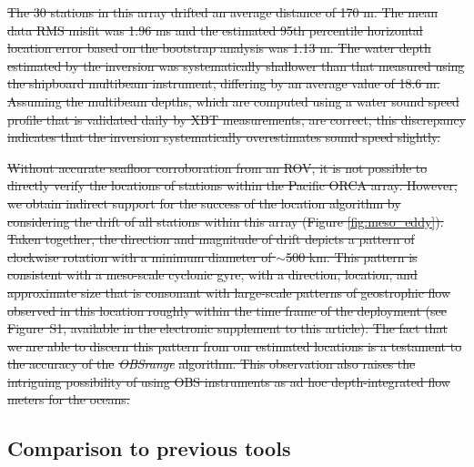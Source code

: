 \documentclass[10pt,titlepage]{article}
\providecommand{\DIFdeltex}[1]{{\protect\color{red}\sout{#1}}}                      %
\providecommand{\DIFaddbegin}{} %
\providecommand{\DIFaddend}{} %
\providecommand{\DIFdelbegin}{} %
\providecommand{\DIFdelend}{} %
\providecommand{\DIFdel}[1]{\texorpdfstring{\DIFdeltex{#1}}{}} %
\begin{document}
\DIFdelbegin \DIFdel{The 30 stations in this array drifted an average distance of 170 m. The mean data RMS misfit was 1.96 ms and the estimated 95th percentile horizontal location error based on the bootstrap analysis was 1.13 m. The water depth estimated by the inversion was systematically shallower than that measured using the shipboard multibeam instrument, differing by an average value of 18.6 m. Assuming the multibeam depths, which are computed using a water sound speed profile that is validated daily by XBT measurements, are correct, this discrepancy indicates that the inversion systematically overestimates sound speed slightly. 
}%

\DIFdel{Without accurate seafloor corroboration from an ROV, it is not possible to directly verify the locations of stations within the Pacific ORCA array. However, we  obtain indirect support for the success of the location algorithm by considering the drift of all stations within this array (Figure \ref{fig:meso_eddy}).
Taken together, the direction and magnitude of drift depicts a pattern of clockwise rotation with a minimum diameter of $\sim$500 km. This pattern is consistent with a meso-scale cyclonic gyre, with a direction, location, and approximate size that is consonant with large-scale patterns of geostrophic flow observed in this location roughly within the time frame of the deployment (see Figure~S1, available in the electronic supplement to this article). The fact that we are able to discern this pattern from our estimated locations is a testament to the accuracy of the }\textit{\DIFdel{OBSrange}} %
\DIFdel{algorithm. This observation also raises the intriguing possibility of using OBS instruments as ad hoc depth-integrated flow meters for the oceans. 
}%

\DIFdelend \subsection{Comparison to previous tools} \DIFaddbegin \label{sec:Comparison_to_previous_tools}
\DIFaddend 
\end{document}
